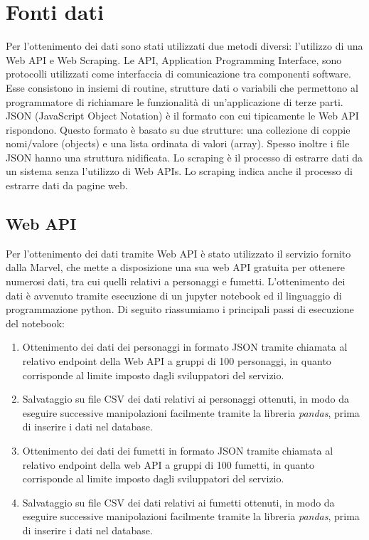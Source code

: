 \documentclass[
12pt, %
a4paper, %
oneside, %
headinclude,footinclude, %
BCOR5mm, %
]{scrartcl}
\begin{document}

\section{Fonti dati}
Per l'ottenimento dei dati sono stati utilizzati due metodi diversi: l'utilizzo di una Web API e Web Scraping.
Le API, Application Programming Interface, sono protocolli utilizzati come interfaccia di comunicazione tra componenti software. Esse consistono in insiemi di routine, strutture dati o variabili che permettono al programmatore di richiamare le funzionalità di un’applicazione di terze parti. \cite{BigDataBook}
JSON (JavaScript Object Notation) è il formato con cui tipicamente le Web API rispondono. Questo formato è basato su due strutture: una collezione di coppie nomi/valore (objects) e una lista ordinata di valori (array). Spesso inoltre i file JSON hanno una struttura nidificata.
Lo scraping è il processo di estrarre dati da un sistema senza l'utilizzo di Web APIs. Lo scraping indica anche il processo di estrarre dati da pagine web.

\subsection{Web API}
Per l'ottenimento dei dati tramite Web API è stato utilizzato il servizio fornito dalla Marvel, che mette a disposizione una sua web API gratuita per ottenere numerosi dati, tra cui quelli relativi a personaggi e fumetti.
L'ottenimento dei dati è avvenuto tramite esecuzione di un jupyter notebook ed il linguaggio di programmazione python.
Di seguito riassumiamo i principali passi di esecuzione del notebook:
\begin{enumerate}
\item Ottenimento dei dati dei personaggi in formato JSON tramite chiamata al relativo endpoint della Web API a gruppi di 100 personaggi, in quanto corrisponde al limite imposto dagli sviluppatori del servizio.
\item Salvataggio su file CSV dei dati relativi ai personaggi ottenuti, in modo da eseguire successive manipolazioni facilmente tramite la libreria \textit{pandas}, prima di inserire i dati nel database.
\item Ottenimento dei dati dei fumetti in formato JSON tramite chiamata al relativo endpoint della web API a gruppi di 100 fumetti, in quanto corrisponde al limite imposto dagli sviluppatori del servizio.
\item Salvataggio su file CSV dei dati relativi ai fumetti ottenuti, in modo da eseguire successive manipolazioni facilmente tramite la libreria \textit{pandas}, prima di inserire i dati nel database.
\end{enumerate}
\end{document}
